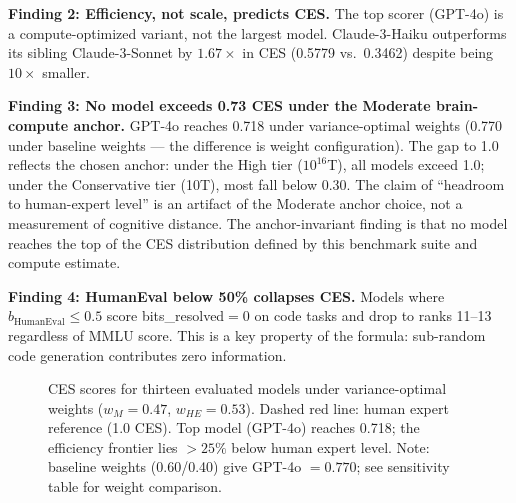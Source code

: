 \documentclass[12pt]{article}
\begin{document}
\textbf{Finding 2: Efficiency, not scale, predicts CES.} The top scorer (GPT-4o) is a compute-optimized variant, not the largest model. Claude-3-Haiku outperforms its sibling Claude-3-Sonnet by $1.67\times$ in CES (0.5779 vs.\ 0.3462) despite being $10\times$ smaller.

\textbf{Finding 3: No model exceeds 0.73 CES under the Moderate brain-compute anchor.} GPT-4o reaches 0.718 under variance-optimal weights (0.770 under baseline weights --- the difference is weight configuration). The gap to 1.0 reflects the chosen anchor: under the High tier ($10^{16}$T), all models exceed 1.0; under the Conservative tier (10T), most fall below 0.30. The claim of ``headroom to human-expert level'' is an artifact of the Moderate anchor choice, not a measurement of cognitive distance. The anchor-invariant finding is that no model reaches the top of the CES distribution defined by this benchmark suite and compute estimate.

\textbf{Finding 4: HumanEval below 50\% collapses CES.} Models where $b_{\text{HumanEval}} \leq 0.5$ score bits\_resolved$=0$ on code tasks and drop to ranks 11--13 regardless of MMLU score. This is a key property of the formula: sub-random code generation contributes zero information.

\begin{figure}[H]
\centering
{}
\caption{CES scores for thirteen evaluated models under variance-optimal weights ($w_M=0.47$, $w_{HE}=0.53$). Dashed red line: human expert reference (1.0 CES). Top model (GPT-4o) reaches 0.718; the efficiency frontier lies $>25\%$ below human expert level. Note: baseline weights (0.60/0.40) give GPT-4o $= 0.770$; see sensitivity table for weight comparison.}
\label{fig:ces-ranking}
\end{figure}
\end{document}
